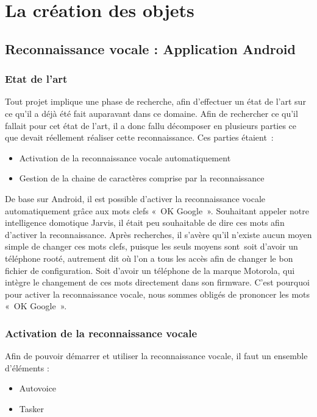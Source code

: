 \chapter{La création des objets}

\section{Reconnaissance vocale : Application Android}
	\subsection{Etat de l’art}	
Tout projet implique une phase de recherche, afin d'effectuer un état de l'art sur ce qu'il a déjà été fait 
auparavant dans ce domaine. Afin de rechercher ce qu'il fallait pour cet état de l'art, il a donc fallu 
décomposer en plusieurs parties ce que devait réellement réaliser cette reconnaissance. Ces parties étaient :

\begin{itemize}
\item Activation de la reconnaissance vocale automatiquement
\item Gestion de la chaine de caractères comprise par la reconnaissance
\end{itemize}

De base sur Android, il est possible d'activer la reconnaissance vocale  automatiquement grâce aux mots clefs 
« OK Google ». Souhaitant appeler notre intelligence domotique Jarvis, il était peu souhaitable de dire ces 
mots afin d'activer la reconnaissance.
Après recherches, il s'avère qu'il n'existe aucun moyen simple de changer ces mots clefs, puisque les seuls 
moyens sont soit d'avoir un téléphone rooté, autrement dit où l'on a tous les accès afin de changer le bon 
fichier de configuration. Soit d'avoir un téléphone de la marque Motorola, qui intègre le changement de ces 
mots directement dans son firmware. C'est pourquoi pour activer la reconnaissance vocale, nous sommes obligés 
de prononcer les mots « OK Google ».
	
	\subsection{Activation de la reconnaissance vocale}
	
Afin de pouvoir démarrer et utiliser la reconnaissance vocale, il faut un ensemble d'éléments :
\begin{itemize}
 \item Autovoice
 \item Tasker
\end{itemize}

